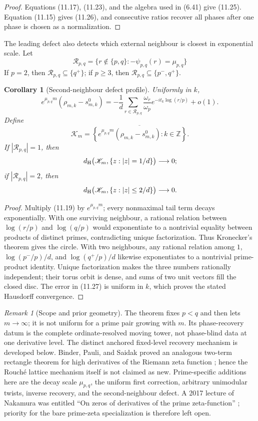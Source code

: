 \documentclass[11pt]{article}
\newtheorem{corollary}[theorem]{Corollary}
\theoremstyle{definition}
\theoremstyle{remark}
\newtheorem{remark}[theorem]{Remark}
\begin{document}
\begin{proof}
Equations (11.17), (11.23), and the algebra used in (6.41) give (11.25).
Equation (11.15) gives (11.26), and consecutive ratios recover all phases after
one phase is chosen as a normalization.
\end{proof}

The leading defect also detects which external neighbour is closest in exponential
scale.  Let
\[
 \mathcal R_{p,q}=\{r\notin\{p,q\}:-\psi_{p,q}(r)=\mu_{p,q}\}
\]
If $p=2$, then $\mathcal R_{p,q}\subseteq\{q^+\}$; if $p\ge3$, then
$\mathcal R_{p,q}\subseteq\{p^-,q^+\}$.

\begin{corollary}[Second-neighbour defect profile]
\label{cor:defect-profile}
Uniformly in $k$,
\[
 e^{\mu_{p,q}m}(\rho_{m,k}-s^0_{m,k})
 =-\frac1d\sum_{r\in\mathcal R_{p,q}}
 \frac{\omega_r}{\omega_p}e^{-it_k\log(r/p)}+o(1).
\tag{11.27}
\]
Define
\[
 \mathscr K_m=\overline{\left\{
 e^{\mu_{p,q}m}(\rho_{m,k}-s^0_{m,k}):k\in\mathbb Z
 \right\}}.
\]
If $|\mathcal R_{p,q}|=1$, then
\[
 d_{\rm H}\bigl(\mathscr K_m,\{z:|z|=1/d\}\bigr)\longrightarrow0;
\]
if $|\mathcal R_{p,q}|=2$, then
\[
 d_{\rm H}\bigl(\mathscr K_m,\{z:|z|\le2/d\}\bigr)\longrightarrow0.
\]
\end{corollary}

\begin{proof}
Multiply (11.19) by $e^{\mu_{p,q}m}$; every nonmaximal tail term decays
exponentially.  With one surviving neighbour, a rational relation between
$\log(r/p)$ and $\log(q/p)$ would exponentiate to a nontrivial equality between
products of distinct primes, contradicting unique factorization.  Thus Kronecker's
theorem gives the circle.  With two neighbours, any rational relation among
$1$, $\log(p^-/p)/d$, and $\log(q^+/p)/d$ likewise exponentiates to a
nontrivial prime-product identity.  Unique factorization makes the three numbers
rationally independent; their torus orbit is dense, and sums of two unit vectors
fill the closed disc.  The error in (11.27) is uniform in $k$, which proves the
stated Hausdorff convergence.
\end{proof}

\begin{remark}[Scope and prior geometry]
The theorem fixes $p<q$ and then lets $m\to\infty$; it is not uniform for a prime
pair growing with $m$.  Its phase-recovery datum is the complete
ordinate-resolved moving tower, not phase-blind data at one derivative level.
The distinct anchored fixed-level recovery mechanism is developed below.
Binder, Pauli, and Saidak proved an analogous two-term rectangle theorem for high
derivatives of the Riemann zeta function \cite{BinderPauliSaidak2015}; hence the
Rouch\'e lattice mechanism itself is not claimed as new.  Prime-specific additions
here are the decay scale $\mu_{p,q}$, the uniform first correction, arbitrary
unimodular twists, inverse recovery, and the second-neighbour defect.  A 2017 lecture
of Nakamura was entitled ``On zeros of derivatives of the prime zeta-function''
\cite{Nakamura2017PrimeZeta}; priority for the bare prime-zeta specialization is
therefore left open.
\end{remark}
\end{document}
